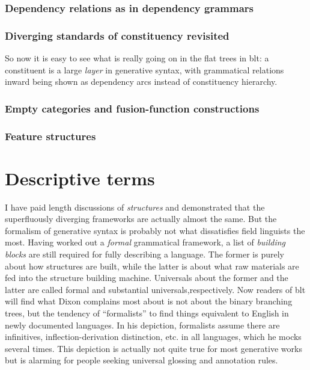 \documentclass[../main.tex]{subfiles}
\begin{document}
\subsubsection{Dependency relations as in dependency grammars}\label{sec:dependency}



\subsubsection{Diverging standards of constituency revisited}

So now it is easy to see what is really going on in the flat trees in \ac{blt}: a constituent
is a large \emph{layer} in generative syntax, with grammatical relations inward being shown as 
dependency arcs instead of constituency hierarchy. 

\subsubsection{Empty categories and fusion-function constructions}

\subsubsection{Feature structures}


\section{Descriptive terms}\label{sec:descriptive-terms}

I have paid length discussions of \emph{structures} 
and demonstrated that the superfluously diverging frameworks are actually almost the same. 
But the formalism of generative syntax is probably not what dissatisfies field linguists the most.
Having worked out a \emph{formal} grammatical framework, 
a list of \emph{building blocks} are still required for fully describing a language. 
The former is purely about how structures are built, 
while the latter is about what raw materials are fed into the structure building machine. 
Universals about the former and the latter are called formal and substantial universals,respectively. 
Now readers of \ac{blt} will find 
what Dixon complains most about is not about the binary branching trees, 
but the tendency of ``formalists'' to find things equivalent to English in newly documented languages. 
In his depiction, formalists assume there are infinitives, 
inflection-derivation distinction, etc. in all languages, which he mocks several times. 
This depiction is actually not quite true for most generative works 
but is alarming for people seeking universal glossing and annotation rules.
\end{document}
